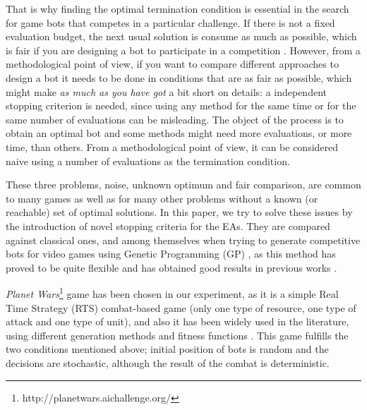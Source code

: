 \documentclass[runningheads,a4paper]{llncs}
\begin{document}
That is why finding the optimal termination condition is essential in the 
search for game bots that competes in a particular challenge. If there is not a 
fixed evaluation budget, the next usual solution is consume as much as possible, 
which is fair if you are designing a bot %
to participate in a competition
\cite{DBLP:conf/cec/Fernandez-AresMGGF11:anon}. However, from a
methodological point of view, if you want to compare different
approaches to design a bot it needs to be done in conditions that are
as fair as possible, which might make {\em as much as you have got} a bit short 
on details: a independent stopping criterion is needed, since using any method 
for the same time or for the same number of evaluations can be misleading. 
The object of the process is to obtain an optimal bot and some methods might 
need more evaluations, or more time, than others.
From a methodological point of view, it can be considered naive using a number of evaluations as the termination condition.

These three problems, noise, unknown optimum and fair comparison, are common to 
many games as well as for many other problems without a known (or reachable) 
set of optimal solutions. In this paper, we try to solve these issues by the
introduction of novel stopping criteria for the EAs. They are compared 
against classical ones, and among themselves when trying to generate 
competitive bots for video games using Genetic Programming (GP) 
\cite{GP_Koza92}, as this method has proved to be quite flexible and has 
obtained good results in previous works \cite{EvoStar2014:GPBot:anon}.%

\textit{Planet Wars}\footnote{http://planetwars.aichallenge.org/} game 
 has been chosen in our experiment, as it is a simple Real Time Strategy (RTS) combat-based game (only one type of resource, one type of attack and one type of unit), and also it has been widely used in the literature, using different generation methods and fitness functions \cite{DBLP:journals/jcst/MoraFGGF12,DBLP:conf/cec/Fernandez-AresMGGF11,DBLP:journals/nc/Lara-CabreraCL14,NogueiraCoevolutionary14}. This
game fulfills the two conditions mentioned above; initial position of bots is 
random and the decisions are stochastic, although the result of the combat is deterministic. 
\end{document}
